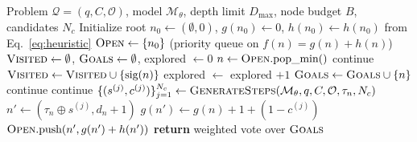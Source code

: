 \documentclass{article}
\makeatletter
\def\AND{\@endauthor\rm\hss \vskip \interauthorskip \@startauthor}
\makeatother
\begin{document}
\begin{algorithm}[t]
\caption{Budgeted A* Search over Reasoning Traces}
\label{alg:astar}
\let\AND\relax\begin{algorithmic}[1]
\REQUIRE Problem $\mathcal{Q}=(q,C,\mathcal{O})$, model $\mathcal{M}_\theta$, depth limit $D_{\max}$, node budget $B$, candidates $N_c$
\STATE Initialize root $n_0 \gets (\emptyset,0)$, $g(n_0) \gets 0$, $h(n_0) \gets h(n_0)$ from Eq.~\eqref{eq:heuristic}
\STATE $\textsc{Open} \gets \{n_0\}$ (priority queue on $f(n)=g(n)+h(n)$)
\STATE $\textsc{Visited} \gets \emptyset$, $\textsc{Goals} \gets \emptyset$, explored $\gets 0$
    \STATE $n \gets \textsc{Open}.\text{pop\_min}()$
        \STATE continue
    \ENDIF
    \STATE $\textsc{Visited} \gets \textsc{Visited} \cup \{\text{sig}(n)\}$
    \STATE explored $\gets$ explored $+ 1$
        \STATE $\textsc{Goals} \gets \textsc{Goals} \cup \{n\}$
        \STATE continue
    \ENDIF
        \STATE continue
    \ENDIF
    \STATE $\{(s^{(j)}, c^{(j)})\}_{j=1}^{N_c} \gets \textsc{GenerateSteps}(\mathcal{M}_\theta, q, C, \mathcal{O}, \tau_n, N_c)$
        \STATE $n' \gets (\tau_n \oplus s^{(j)}, d_n+1)$
        \STATE $g(n') \gets g(n) + 1 + (1-c^{(j)})$
        \STATE $\textsc{Open}.\text{push}(n', g(n') + h(n'))$
    \ENDFOR
\ENDWHILE
\STATE \textbf{return} weighted vote over $\textsc{Goals}$
\end{algorithmic}
\end{algorithm}
\end{document}
